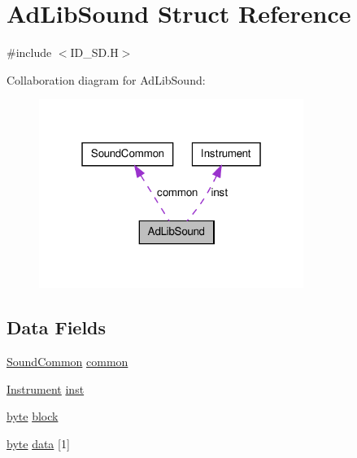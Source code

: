\hypertarget{structAdLibSound}{
\section{AdLibSound Struct Reference}
\label{structAdLibSound}
}


{\ttfamily \#include $<$ID\_\-SD.H$>$}



Collaboration diagram for AdLibSound:
\nopagebreak
\begin{figure}[H]
\begin{center}
\leavevmode
\includegraphics[width=244pt]{structAdLibSound__coll__graph}
\end{center}
\end{figure}
\subsection*{Data Fields}
\begin{DoxyCompactItemize}
\item 
\hyperlink{structSoundCommon}{SoundCommon} \hyperlink{structAdLibSound_ae2615aaecb5be148a6a6ddf9723076f3}{common}
\item 
\hyperlink{structInstrument}{Instrument} \hyperlink{structAdLibSound_a2122cab68a2f7e318ea1b524f0c24d9d}{inst}
\item 
\hyperlink{ID__HEAD_8H_a0c8186d9b9b7880309c27230bbb5e69d}{byte} \hyperlink{structAdLibSound_af6d810a8d7a44467809fb30c6e55b161}{block}
\item 
\hyperlink{ID__HEAD_8H_a0c8186d9b9b7880309c27230bbb5e69d}{byte} \hyperlink{structAdLibSound_a73b03ff21dbe86b08f21d3eb0f9adb64}{data} \mbox{[}1\mbox{]}
\end{DoxyCompactItemize}



